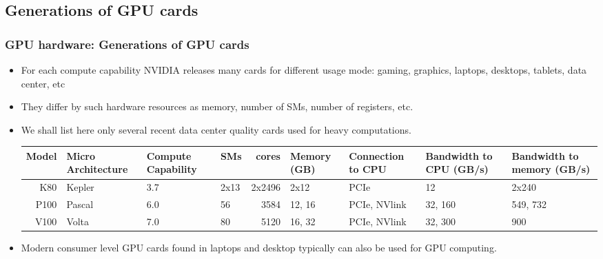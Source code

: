 \subsection{Generations of GPU cards}
\begin{frame}[fragile]
  \frametitle{GPU hardware: Generations of GPU cards}
\begin{itemize}
\item For each compute capability NVIDIA releases many cards 
  for different usage mode: gaming, graphics, laptops, desktops, tablets, data center, etc
\item They differ by such hardware resources as memory, number of SMs, number of registers, etc.
\item We shall list here only several recent data center quality cards used for heavy computations. 

{\tiny
\begin{center}
\begin{tabular}{ |r|p{1.0cm}|p{0.9cm}|p{0.25cm}|r|p{0.7cm}|p{0.9cm}|p{0.8cm}|p{0.8cm}| } 
 \hline
 Model & {Micro Architecture} & {Compute Capability} & SMs  & cores &  Memory (GB) & {Connection to CPU} & {Bandwidth to CPU (GB/s)} & {Bandwidth to memory (GB/s)} \\ \hline
 K80   & Kepler               & 3.7                  & 2x13 & 2x2496& 2x12         & PCIe                & 12                        & 2x240                        \\ \hline
 P100  & Pascal               & 6.0                  & 56   & 3584  & 12, 16       & PCIe, NVlink        & 32, 160                   & 549, 732                     \\ \hline
 V100  & Volta                & 7.0                  & 80   & 5120  & 16, 32       & PCIe, NVlink        & 32, 300                   & 900                          \\ \hline
\end{tabular}
\end{center}
}

\item Modern consumer level GPU cards found in laptops and desktop typically can also be used for GPU computing.
\end{itemize}
\end{frame}